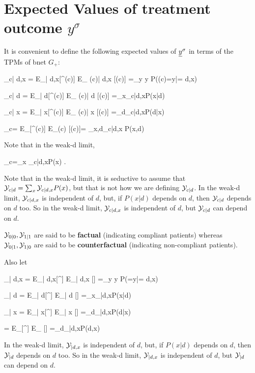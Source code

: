 \section{Expected Values of
 treatment outcome $y^\sigma$}

It is convenient
to define
the following
expected values of
${\underline{y}}^\sigma$
in terms of the TPMs of
bnet $G_{+}$:

\beq
\caly_{c| d,x}
=
E_{\s| d,x}[\rvy^\s(c)]
\rarrow
E_{ \rvy(c)| d,x} [\rvy(c)]
=\sum_{y} y
P(\rvy(c)=y|\rvd= d,x)
\label{eq-need-positivity}
\eeq

\beq
\caly_{c| d}
=
E_{\s| d}[\rvy^\s(c)]
\rarrow
E_{ \rvy(c)| d} [\rvy(c)]
=\sum_x\caly_{c|d,x}P(x|d)
\eeq

\beq
\caly_{c| x}
=
E_{\s| x}[\rvy^\s(c)]
\rarrow
E_{ \rvy(c)| x} [\rvy(c)]
=\sum_d\caly_{c|d,x}P(d|x)
\eeq


\beq
\caly_c=
E_{\s}[\rvy^\s(c)]
\rarrow
E_{\rvy(c)} [\rvy(c)]=
\sum_{x,d}\caly_{c|d,x} P(x,d)
\eeq

Note that in the weak-d limit,


\beq
\caly_c=\sum_x \caly_{c|d,x}P(x)
\;.
\eeq

Note that in the weak-d limit,
it is seductive to assume that
${\cal Y}_{c|d}=
\sum_x{\cal Y}_{c|d,x}P(x)$, 
but that is not how we are
defining 
${\cal Y}_{c|d}$.
In the weak-d limit,
${\cal Y}_{c|d,x}$ is independent
of $d$, but,
if $P(x|d)$ depends on $d$,
then
 ${\cal Y}_{c|d}$ depends on $d$ too.
So in the weak-d limit,
${\cal Y}_{c|d, x}$ is independent
of $d$,
but ${\cal Y}_{c|d}$
can depend on $d$.


${\cal Y}_{0|0}, {\cal Y}_{1|1}$
are said to be {\bf factual} 
(indicating compliant patients)
whereas 
${\cal Y}_{0|1}, {\cal Y}_{1|0}$
are said to be {\bf counterfactual} 
(indicating non-compliant patients).

Also let

\beq
\caly_{| d,x}
=
E_{\s| d,x}[\rvy^\s]
\rarrow
E_{\rvy| d,x} [\rvy]
=\sum_{y} y
P(\rvy=y|\rvd= d,x)
\eeq


\beq
\caly_{| d}
=
E_{\s| d}[\rvy^\s]
\rarrow
E_{\rvy| d} [\rvy]
=\sum_x\caly_{|d,x}P(x|d)
\eeq

\beq
\caly_{| x}
=
E_{\s| x}[\rvy^\s]
\rarrow
E_{\rvy| x} [\rvy]
=\sum_d\caly_{|d,x}P(d|x)
\eeq

\beq
\caly
=
E_{\s}[\rvy^\s]
\rarrow
E_{\rvy} [\rvy]
=\sum_d\caly_{|d,x}P(d,x)
\eeq


In the weak-d limit,
${\cal Y}_{|d,x}$ is independent
of $d$, but,
if $P(x|d)$ depends on $d$,
then
 ${\cal Y}_{|d}$ depends on $d$ too.
So in the weak-d limit,
${\cal Y}_{|d, x}$ is independent
of $d$,
but ${\cal Y}_{|d}$
can depend on $d$.



